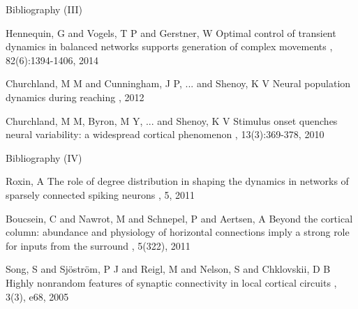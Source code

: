 \documentclass[fleqn]{beamer}
\begin{document}
\setcounter{page}{18}
\begin{frame}{Bibliography (III)}
\begin{thebibliography}{9}

Hennequin, G and Vogels, T P and Gerstner, W
\newblock Optimal control of transient dynamics in balanced networks
supports generation of complex movements
, 82(6):1394-1406, 2014

Churchland, M M and Cunningham, J P,  ... and Shenoy, K V
\newblock Neural population dynamics during reaching 
, 2012

Churchland, M M, Byron, M Y, ... and Shenoy, K V
\newblock Stimulus onset quenches neural variability: a widespread cortical
phenomenon 
, 13(3):369-378, 2010

\end{thebibliography}

\end{frame}

\setcounter{page}{18}
\begin{frame}{Bibliography (IV)}
\begin{thebibliography}{9}

Roxin, A
\newblock The role of degree distribution in shaping the dynamics in
networks of sparsely connected spiking neurons
, 5, 2011

Boucsein, C and Nawrot, M and Schnepel, P and Aertsen, A
\newblock Beyond the cortical column: abundance and physiology of horizontal
connections imply a strong role for inputs from the surround
, 5(322), 2011

Song, S and Sj\"{o}str\"{o}m, P J and Reigl, M and Nelson, S and Chklovskii, D
B
\newblock Highly nonrandom features of synaptic connectivity in local cortical
circuits 
, 3(3), e68, 2005

\end{thebibliography}

\end{frame}
\end{document}
